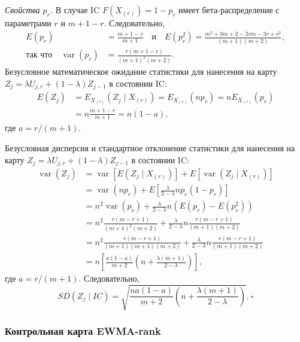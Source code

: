 \emph{Свойства \(p_r\).} В случае IC \(F\left( X_{(r)} \right) = 1 - p_r\) имеет бета-распределение с параметрами \(r\) и \(m + 1 - r\). Следовательно,
\begin{align*}
	E(p_r) &= \frac{m + 1 - r}{m + 1} \quad \text{и} \quad E\left( p_r^2 \right) = \frac{m^2 + 3m + 2 - 2rm - 3r + r^2}{(m + 1)(m + 2)}, \\
	\text{так что} \quad \operatorname{var}(p_r) &= \frac{r(m + 1 - r)}{(m + 1)^2(m + 2)}.
\end{align*}
Безусловное математическое ожидание статистики для нанесения на карту \(Z_j = \lambda U_{j,r} + (1 - \lambda)Z_{j-1}\) в состоянии IC:
\begin{align*}
	E(Z_j) &= E_{X_{(r)}}\left( Z_j \mid X_{(r)} \right) = E_{X_{(r)}}(np_r) = nE_{X_{(r)}}(p_r) \\
	       &= n\frac{m + 1 - r}{m + 1} = n(1 - a),
\end{align*}
где \(a = r/(m + 1)\).

Безусловная дисперсия и стандартное отклонение статистики для нанесения на карту \(Z_j = \lambda U_{j,r} + (1 - \lambda)Z_{j-1}\) в состоянии IC:
\begin{align*}
	\operatorname{var}(Z_j) &= \operatorname{var}\left[ E\left( Z_j \mid X_{(r)} \right) \right] + E\left[ \operatorname{var}\left( Z_j \mid X_{(r)} \right) \right] \\
	&= \operatorname{var}(np_r) + E\left[ \frac{\lambda}{2 - \lambda}np_r(1 - p_r) \right] \\
	&= n^2\operatorname{var}(p_r) + \frac{\lambda}{2 - \lambda}n\left( E(p_r) - E\left( p_r^2 \right) \right) \\
	&= n^2\frac{r(m - r + 1)}{(m + 1)^2(m + 2)} + \frac{\lambda}{2 - \lambda}n\frac{r(m - r + 1)}{(m + 1)(m + 2)} \\
	&= n^2\frac{r(m - r + 1)}{(m + 1)(m + 1)(m + 2)} + \frac{\lambda}{2 - \lambda}n\frac{r(m - r + 1)}{(m + 1)(m + 2)} \\
	&= n\left[ \frac{a(1 - a)}{m + 2}\left( n + \frac{\lambda(m + 1)}{2 - \lambda} \right) \right],
\end{align*}
где \(a = r/(m + 1)\). Следовательно,
\[
	SD(Z_j \mid IC) = \sqrt{\frac{na(1 - a)}{m + 2}\left( n + \frac{\lambda(m + 1)}{2 - \lambda} \right)}. \ \square
\]

\subsubsection{Контрольная карта EWMA-rank}


